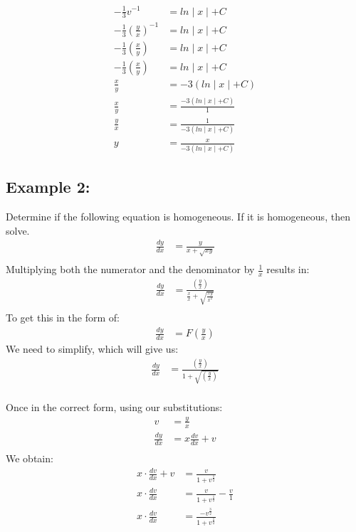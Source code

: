 \documentclass{article}
\begin{document}
\begin{flushleft}
{\begin{align*}
-\frac{1}{3}v^{-1} & = ln\mid x \mid + C \\
-\frac{1}{3}(\frac{y}{x})^{-1} & = ln\mid x \mid + C \\
-\frac{1}{3}(\frac{x}{y}) & = ln\mid x \mid + C \\
-\frac{1}{3}(\frac{x}{y}) & = ln\mid x \mid + C \\
\frac{x}{y} & = -3 (ln\mid x \mid + C) \\
\frac{x}{y} & = \frac{ -3 (ln\mid x \mid + C) }{1} \\
\frac{y}{x} & = \frac{1}{ -3 (ln\mid x \mid + C) } \\
y & =  \frac{x}{ -3 (ln\mid x \mid + C) } 
\end{align*}


\subsection*{\textbf{Example 2:}}
Determine if the following equation is homogeneous. If it is homogeneous, then solve.
\begin{align*}
\frac{dy}{dx} & = \frac{y}{x +\sqrt{xy}}\\
\end{align*}
Multiplying both the numerator and the denominator by $\frac{1}{x}$ results in:\\
\begin{align*}
\frac{dy}{dx} & = \frac{(\frac{y}{x})}{\frac{x}{x} +\sqrt{\frac{xy}{x^2}}}\\
\end{align*}
To get this in the form of:
\begin{align*}
\frac{dy}{dx} & = F (\frac{y}{x})
\end{align*}
We need to simplify, which will give us:\\
\begin{align*}
\frac{dy}{dx} & = \frac{(\frac{y}{x})}{1 +\sqrt{(\frac{y}{x})}}\\
\end{align*}

Once in the correct form, using our substitutions:\\
\begin{align*}
v & = \frac{y}{x}\\
\frac{dy}{dx} & = x \frac{dv}{dx} + v\\
 \end{align*}
We obtain:\\
\begin{align*}
x \cdot \frac{dv}{dx} + v & = \frac{v}{1 + v^\frac{1}{2}}\\
x \cdot  \frac{dv}{dx}  & = \frac{v}{1 + v^\frac{1}{2}} - \frac{v}{1}\\
x \cdot  \frac{dv}{dx}  & = \frac{-v^\frac{3}{2}}{1 + v^\frac{1}{2}}\\
\end{align*}

}
\end{flushleft}
\end{document}
